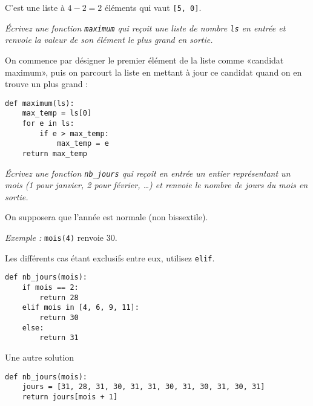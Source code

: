 \begin{Answer}C'est une liste à $4-2=2$ éléments qui vaut \lstinline|[5, 0]|.

\newpage
\end{Answer}
\begin{Exercise}\it
Écrivez une fonction \lstinline|maximum| qui reçoit une liste de nombre \lstinline|ls| en entrée et renvoie la valeur de son élément le plus grand en sortie.
\end{Exercise}
\begin{Answer}On commence par désigner le premier élément de la liste comme «candidat maximum», puis on parcourt la liste en mettant à jour ce candidat quand on en trouve un plus grand :

\begin{lstlisting}
def maximum(ls):
    max_temp = ls[0]
    for e in ls:
        if e > max_temp:
            max_temp = e
    return max_temp
\end{lstlisting}

\end{Answer}
\begin{Exercise}\it
Écrivez une fonction \lstinline|nb_jours| qui reçoit en entrée un entier représentant un mois (1 pour janvier, 2 pour février, \dots) et renvoie le nombre de jours du mois en sortie. 

On supposera que l'année est normale (non bissextile).

\emph{Exemple :} \lstinline|mois(4)| renvoie 30. 
\end{Exercise}
\begin{Answer}Les différents cas étant exclusifs entre eux, utilisez \lstinline|elif|.

\begin{lstlisting}
def nb_jours(mois):
    if mois == 2:
        return 28
    elif mois in [4, 6, 9, 11]:
        return 30
    else:
        return 31
\end{lstlisting}

Une autre solution

\begin{lstlisting}
def nb_jours(mois):
    jours = [31, 28, 31, 30, 31, 31, 30, 31, 30, 31, 30, 31]
    return jours[mois + 1]
\end{lstlisting}
\end{Answer}
